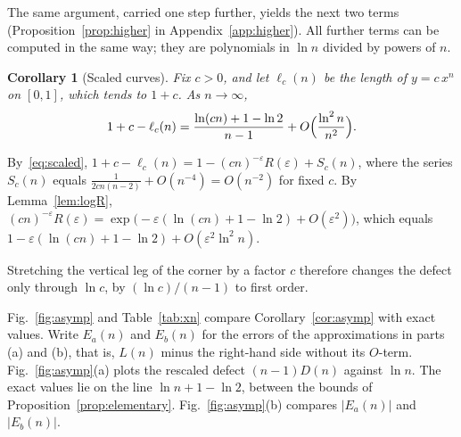 \documentclass[journal]{IEEEtran}
\newtheorem{corollary}{Corollary}
\newcommand{\eps}{\varepsilon}
\begin{document}
The same argument, carried one step further, yields the next two terms
(Proposition~\ref{prop:higher} in Appendix~\ref{app:higher}). All further terms can be computed
in the same way; they are polynomials in $\ln n$ divided by powers of $n$.

\begin{corollary}[Scaled curves]\label{cor:scaled}
Fix $c>0$, and let $\ell_c(n)$ be the length of $y=c\,x^n$ on $[0,1]$, which tends to $1+c$.
As $n\to\infty$,
\[
  1+c-\ell_c(n)=\frac{\ln(cn)+1-\ln2}{n-1}+O\Bigl(\frac{\ln^2n}{n^2}\Bigr).
\]
\end{corollary}

\begin{IEEEproof}
By~\eqref{eq:scaled}, $1+c-\ell_c(n)=1-(cn)^{-\eps}R(\eps)+S_c(n)$, where the series $S_c(n)$
equals $\frac{1}{2cn(n-2)}+O(n^{-4})=O(n^{-2})$ for fixed $c$. By Lemma~\ref{lem:logR},
$(cn)^{-\eps}R(\eps)=\exp\bigl(-\eps(\ln(cn)+1-\ln2)+O(\eps^2)\bigr)$, which equals
$1-\eps(\ln(cn)+1-\ln2)+O(\eps^2\ln^2n)$.
\end{IEEEproof}

Stretching the vertical leg of the corner by a factor $c$ therefore changes the defect only
through $\ln c$, by $(\ln c)/(n-1)$ to first order.

Fig.~\ref{fig:asymp} and Table~\ref{tab:xn} compare Corollary~\ref{cor:asymp} with exact values. Write
$E_a(n)$ and $E_b(n)$ for the errors of the approximations in parts (a) and (b), that is, $L(n)$
minus the right-hand side without its $O$-term. Fig.~\ref{fig:asymp}(a) plots the rescaled
defect $(n-1)D(n)$ against $\ln n$. The exact values lie on the line $\ln n+1-\ln2$, between the
bounds of Proposition~\ref{prop:elementary}. Fig.~\ref{fig:asymp}(b) compares $|E_a(n)|$ and
$|E_b(n)|$.
\end{document}
